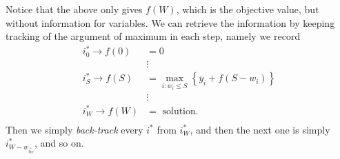 \begin{answer}
\begin{itemize}
		      Notice that the above only gives \(f(W)\), which is the objective value, but without information for variables. We can retrieve the
		      information by keeping tracking of the argument of maximum in each step, namely we record
		      \[
			      \begin{split}
				      i^{\ast}_{0 }\to f(0) &= 0\\
				      &\vdots\\
				      i^{\ast}_S \to f(S) &= \max_{i\colon w_{i}\leq S}\left\{ \overline{y}_{i} + f(S - w_{i})\right\}\\
				      &\vdots\\
				      i^{\ast}_W \to f(W) &= \text{ solution}.\\
			      \end{split}
		      \]
		      Then we simply \emph{back-track} every \(i^{\ast}\) from \(i^{\ast}_W\), and then the next one is simply \(i^{\ast}_{W - w_{i^{\ast}_W}}\), and
		      so on.
	\end{itemize}
\end{answer}